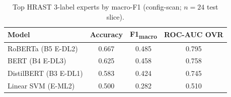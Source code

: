 \begin{table}[t]
  \centering
  \caption{Top HRAST 3-label experts by macro-F1 (config-scan; $n{=}24$ test slice).}
  \label{tab:hrast_top3}
  \begin{tabular}{@{}lccc@{}}
    \toprule
    \textbf{Model} & \textbf{Accuracy} & \textbf{F1\textsubscript{macro}} & \textbf{ROC-AUC OVR} \\
    \midrule
    RoBERTa (B5 E-DL2) & 0.667 & 0.485 & 0.795 \\
    BERT (B4 E-DL3) & 0.625 & 0.458 & 0.758 \\
    DistilBERT (B3 E-DL1) & 0.583 & 0.424 & 0.745 \\
    Linear SVM (E-ML2) & 0.500 & 0.282 & 0.510 \\
    \bottomrule
  \end{tabular}
\end{table}
